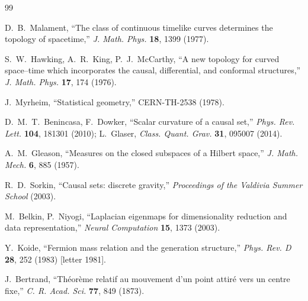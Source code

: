\documentclass[10pt,twoside,openany]{book}
\begin{document}
\begin{thebibliography}{99}

D.~B.~Malament, ``The class of continuous timelike curves determines the topology of
spacetime,'' \emph{J. Math. Phys.} \textbf{18}, 1399 (1977).

S.~W.~Hawking, A.~R.~King, P.~J.~McCarthy, ``A new topology for curved space--time which
incorporates the causal, differential, and conformal structures,'' \emph{J. Math. Phys.}
\textbf{17}, 174 (1976).

J.~Myrheim, ``Statistical geometry,'' CERN-TH-2538 (1978).

D.~M.~T.~Benincasa, F.~Dowker, ``Scalar curvature of a causal set,'' \emph{Phys. Rev. Lett.}
\textbf{104}, 181301 (2010); L.~Glaser, \emph{Class. Quant. Grav.} \textbf{31}, 095007
(2014).

A.~M.~Gleason, ``Measures on the closed subspaces of a Hilbert space,''
\emph{J. Math. Mech.} \textbf{6}, 885 (1957).

R.~D.~Sorkin, ``Causal sets: discrete gravity,'' \emph{Proceedings of the Valdivia Summer
School} (2003).

M.~Belkin, P.~Niyogi, ``Laplacian eigenmaps for dimensionality reduction and data
representation,'' \emph{Neural Computation} \textbf{15}, 1373 (2003).

Y.~Koide, ``Fermion mass relation and the generation structure,'' \emph{Phys. Rev. D}
\textbf{28}, 252 (1983) [letter 1981].

J.~Bertrand, ``Th\'eor\`eme relatif au mouvement d'un point attir\'e vers un centre fixe,''
\emph{C. R. Acad. Sci.} \textbf{77}, 849 (1873).

\end{thebibliography}
\end{document}
